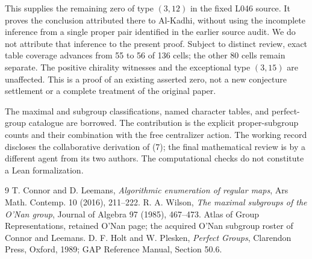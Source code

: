 \documentclass[11pt,a4paper]{article}
\begin{document}
This supplies the remaining zero of type $(3,12)$ in the fixed L046
source. It proves the conclusion attributed there to Al-Kadhi, without
using the incomplete inference from a single proper pair identified in
the earlier source audit. We do not attribute that inference to the
present proof. Subject to distinct review, exact table coverage advances
from 55 to 56 of 136 cells; the other 80 cells remain separate.
The positive chirality witnesses and the exceptional type $(3,15)$ are
unaffected. This is a proof of an existing asserted zero, not a new
conjecture settlement or a complete treatment of the original paper.

The maximal and subgroup classifications, named character tables,
and perfect-group catalogue are borrowed. The contribution is the
explicit proper-subgroup counts and their combination with the free
centralizer action. The working record discloses the collaborative
derivation of (7); the final mathematical review is by a different
agent from its two authors. The computational checks do not constitute
a Lean formalization.
\begin{thebibliography}{9}
 T. Connor and D. Leemans, \emph{Algorithmic enumeration of
regular maps}, Ars Math. Contemp. 10 (2016), 211--222.
 R. A. Wilson, \emph{The maximal subgroups of the O'Nan
group}, Journal of Algebra 97 (1985), 467--473.
 Atlas of Group Representations, retained O'Nan page;
the acquired O'Nan subgroup roster of Connor and Leemans.
 D. F. Holt and W. Plesken, \emph{Perfect Groups},
Clarendon Press, Oxford, 1989; GAP Reference Manual, Section 50.6.
\end{thebibliography}
\end{document}
